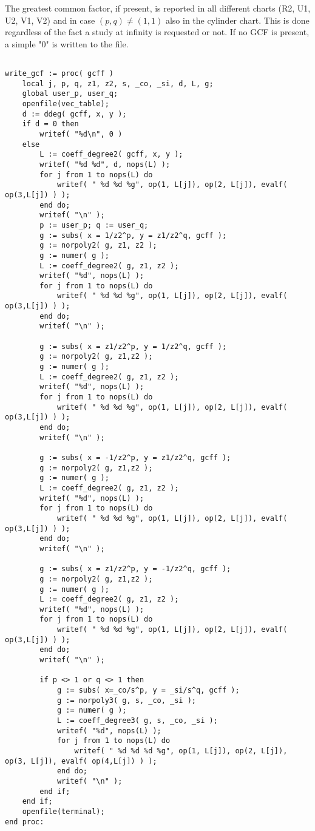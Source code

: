 \documentclass[a4paper,10pt]{article}
\begin{document}
The greatest common factor, if present, is reported in all different charts (R2, U1, U2, V1, V2) and in case $(p,q)\not=(1,1)$ also in the cylinder chart.  This is done regardless of the fact a study at infinity is requested or not.  If no GCF is present, a simple "0"  is written to the file.

\begin{lstlisting}[name=writelog]

write_gcf := proc( gcff )
    local j, p, q, z1, z2, s, _co, _si, d, L, g;
    global user_p, user_q;
    openfile(vec_table);
    d := ddeg( gcff, x, y );
    if d = 0 then
        writef( "%d\n", 0 )
    else
        L := coeff_degree2( gcff, x, y );
        writef( "%d %d", d, nops(L) );
        for j from 1 to nops(L) do
            writef( " %d %d %g", op(1, L[j]), op(2, L[j]), evalf( op(3,L[j]) ) );
        end do;
        writef( "\n" );
        p := user_p; q := user_q;
        g := subs( x = 1/z2^p, y = z1/z2^q, gcff );
        g := norpoly2( g, z1, z2 );
        g := numer( g );
        L := coeff_degree2( g, z1, z2 );
        writef( "%d", nops(L) );
        for j from 1 to nops(L) do
            writef( " %d %d %g", op(1, L[j]), op(2, L[j]), evalf( op(3,L[j]) ) );
        end do;
        writef( "\n" );

        g := subs( x = z1/z2^p, y = 1/z2^q, gcff );
        g := norpoly2( g, z1,z2 );
        g := numer( g );
        L := coeff_degree2( g, z1, z2 );
        writef( "%d", nops(L) );
        for j from 1 to nops(L) do
            writef( " %d %d %g", op(1, L[j]), op(2, L[j]), evalf( op(3,L[j]) ) );
        end do;
        writef( "\n" );

        g := subs( x = -1/z2^p, y = z1/z2^q, gcff );
        g := norpoly2( g, z1,z2 );
        g := numer( g );
        L := coeff_degree2( g, z1, z2 );
        writef( "%d", nops(L) );
        for j from 1 to nops(L) do
            writef( " %d %d %g", op(1, L[j]), op(2, L[j]), evalf( op(3,L[j]) ) );
        end do;
        writef( "\n" );

        g := subs( x = z1/z2^p, y = -1/z2^q, gcff );
        g := norpoly2( g, z1,z2 );
        g := numer( g );
        L := coeff_degree2( g, z1, z2 );
        writef( "%d", nops(L) );
        for j from 1 to nops(L) do
            writef( " %d %d %g", op(1, L[j]), op(2, L[j]), evalf( op(3,L[j]) ) );
        end do;
        writef( "\n" );

        if p <> 1 or q <> 1 then
            g := subs( x=_co/s^p, y = _si/s^q, gcff );
            g := norpoly3( g, s, _co, _si );
            g := numer( g );
            L := coeff_degree3( g, s, _co, _si );
            writef( "%d", nops(L) );
            for j from 1 to nops(L) do
                writef( " %d %d %d %g", op(1, L[j]), op(2, L[j]), op(3, L[j]), evalf( op(4,L[j]) ) );
            end do;
            writef( "\n" );
        end if;
    end if;
    openfile(terminal);
end proc:
\end{lstlisting}
\end{document}

